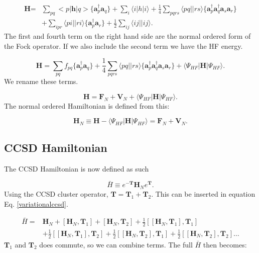 \documentclass[a4paper,norsk,11pt,twoside]{report}
\begin{document}
\begin{align}
\textbf{H} = & \sum_{pq} <p|\textbf{h}|q> 
\{\textbf{a}^{\dag}_p \textbf{a}_q \}
+ \sum_i \langle i|h|i \rangle
 + \frac{1}{4}
\sum_{pqrs} \langle pq||rs \rangle \{\textbf{a}^{\dag}_p \textbf{a}^{\dag}_q \textbf{a}_s \textbf{a}_r\}
 \\ &
+ \sum_{ipr} \langle pi||ri \rangle \{\textbf{a}^{\dag}_p \textbf{a}_r \}
+ \frac{1}{2} \sum_{ij} \langle ij||ij \rangle . \nonumber
\end{align}
The first and fourth term on the right hand side are the normal ordered form of the Fock operator. If we also include the second term we have the HF energy.

\begin{equation}
\textbf{H} = \sum_{pq} f_{pq} 
\{\textbf{a}^{\dag}_p \textbf{a}_q \}
 + \frac{1}{4}
\sum_{pqrs} \langle pq||rs \rangle \{\textbf{a}^{\dag}_p \textbf{a}^{\dag}_q \textbf{a}_s \textbf{a}_r\}
+ \langle \Psi_{HF} | \textbf{H} |\Psi_{HF} \rangle .
\end{equation}
We rename these terms.

\begin{equation}
\textbf{H} = \textbf{F}_N + \textbf{V}_N + \langle \Psi_{HF} | \textbf{H} |\Psi_{HF} \rangle .
\end{equation}
The normal ordered Hamiltonian is defined from this:

\begin{equation}
\textbf{H}_N \equiv 
\textbf{H} - \langle \Psi_{HF} | \textbf{H} |\Psi_{HF} \rangle = 
\textbf{F}_N + \textbf{V}_N . \label{normal_order_hamiltonian}
\end{equation}

\subsection{CCSD Hamiltonian}

The CCSD Hamiltonian is now defined as such

\begin{equation}
\bar{H} \equiv e^{-\textbf{T}} \textbf{H}_N e^{\textbf{T}}  .
\end{equation}
Using the CCSD cluster operator, $\textbf{T} = \textbf{T}_1 + \textbf{T}_2$. This can be inserted in equation Eq. \eqref{variationalccsd}. 

\begin{align}
\bar{H} = & 
\textbf{H}_N 
+ \left[ \textbf{H}_N, \textbf{T}_1 \right] 
+ \left[ \textbf{H}_N, \textbf{T}_2 \right] 
+ \frac{1}{2} \left[ [\textbf{H}_N, \textbf{T}_1], \textbf{T}_1 \right]  \\ &
+ \frac{1}{2} \left[ [\textbf{H}_N, \textbf{T}_1], \textbf{T}_2  \right]
+ \frac{1}{2} \left[ [\textbf{H}_N, \textbf{T}_2], \textbf{T}_1 \right]
+ \frac{1}{2} \left[ [\textbf{H}_N, \textbf{T}_2], \textbf{T}_2 \right] \dots \nonumber
\end{align}
$\textbf{T}_1$ and $\textbf{T}_2$ does commute, so we can combine terms. The full $\bar{H}$ then becomes:
\end{document}

